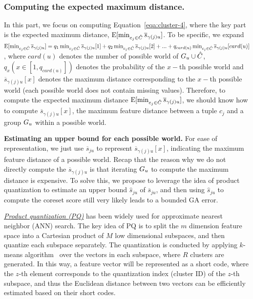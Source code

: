  


\subsubsection{Computing the expected maximum distance.} In this part, we focus on computing Equation~\ref{eqa:cluster-4}, where the key part is the expected maximum distance, \ie $\mathrm{E}[\min_{c_j\in \hat{C}}\overline{s}_{\gamma(j)u}]$. To be specific, we expand $\mathrm{E}[\min_{c_j\in \hat{C}}\overline{s}_{\gamma(j)u}] = q_1\min_{c_j\in \hat{C}}\overline{s}_{\gamma(j)u}[1] + q_2\min_{c_j\in \hat{C}}\overline{s}_{\gamma(j)u}[2] + ... +q_{card(u)}\min_{c_j\in \hat{C}}\overline{s}_{\gamma(j)u}[card(u)]$, where $card(u)$ denotes the number of possible world of $G_u \cup \hat{C}$, $q_x    (x\in [1, q_{card(u)}])$ denotes the probability of the $x-$th possible world and  $\overline{s}_{\gamma(j)u}[x]$ denotes the maximum distance  corresponding to the $x-$th possible world (each possible world does not contain missing values). 
%
%
%
Therefore, to compute the expected maximum distance $\mathrm{E}[\min_{c_j\in \hat{C}}\overline{s}_{\gamma(j)u}]$, we should know how to compute $\overline{s}_{\gamma(j)u}[x]$, \ie the  maximum feature distance between a tuple $c_j$ and a group $G_u$ within a possible world.

\noindent \textbf{Estimating an upper bound for each possible world.} 
For ease of representation, we just use $\overline{s}_{ju}$ to represent  $\overline{s}_{\gamma(j)u}[x]$, indicating the maximum feature distance of a possible world.
%
%
 Recap that the reason why we do not directly compute the  $\overline{s}_{\gamma(j)u}$ is that iterating $G_u$ to compute the maximum distance is expensive.
  To solve this, we propose to leverage the idea of product quantization  to estimate an upper bound $\hat{s}_{ju}$ of $\overline{s}_{ju}$, and then using $\hat{s}_{ju}$ to compute the coreset score still very likely leads to a bounded GA error.
  
  \noindent  \underline{\textit{Product quantization (PQ)}}  has been widely used for approximate nearest neighbor (ANN) search.  The key idea of PQ is to split the $m$ dimension feature space into a Cartesian product of $M$ low dimensional subspaces, and then quantize each subspace separately.  
 The quantization is conducted by applying $k$-means algorithm~\cite{hartigan1979algorithm} over the vectors in each subspace, where $R$ clusters are generated.  
  In this way, a feature vector will be represented as a short code, where the $z$-th element corresponds to the quantization index (\ie cluster ID) of the $z$-th subspace, and thus the Euclidean distance between two vectors can be efficiently estimated based on their short codes. 
  
